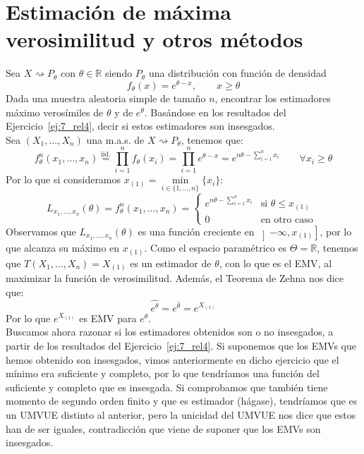\newpage
\section{Estimación de máxima verosimilitud y otros métodos}
\begin{ejercicio}
    Sea $X\rightsquigarrow P_\theta$ con $\theta\in \mathbb{R}$ siendo $P_\theta$ una distribución con función de densidad
    \begin{equation*}
        f_\theta(x) = e^{\theta-x}, \qquad x\geq \theta
    \end{equation*}
    Dada una muestra aleatoria simple de tamaño $n$, encontrar los estimadores máximo verosímiles de $\theta$ y de $e^\theta$. Basándose en los resultados del Ejercicio~\ref{ej:7_rel4}, decir si estos estimadores son insesgados.\\

    \noindent
    Sea $(X_1, \ldots, X_n)$ una m.a.s. de $X\rightsquigarrow  P_\theta$, tenemos que:
    \begin{equation*}
        f^n_\theta(x_1, \ldots, x_n) \stackrel{\text{iid.}}{=} \prod_{i=1}^{n}f_\theta(x_i) = \prod_{i=1}^{n} e^{\theta-x} = e^{n\theta - \sum\limits_{i=1}^n x_i} \qquad \forall x_i \geq \theta
    \end{equation*}
    Por lo que si consideramos $x_{(1)} = \min\limits_{i \in \{1,\ldots,n\}}\{x_i\}$:
    \begin{equation*}
        L_{x_1,\ldots, x_n}(\theta) = f^n_\theta(x_1,\ldots,x_n) = \left\{\begin{array}{ll}
                e^{n\theta - \sum\limits_{i=1}^n x_i}  & \text{si\ } \theta \leq x_{(1)}  \\
             0 & \text{en otro caso\ } 
        \end{array}\right. 
    \end{equation*}
    Observamos que $L_{x_1,\ldots,x_n}(\theta)$ es una función creciente en $\left]-\infty,x_{(1)}\right]$, por lo que alcanza su máximo en $x_{(1)}$. Como el espacio paramétrico es $\Theta = \mathbb{R}$, tenemos que $T(X_1, \ldots, X_n) = X_{(1)}$ es un estimador de $\theta$, con lo que es el EMV, al maximizar la función de verosimilitud. Además, el Teorema de Zehna nos dice que:
    \begin{equation*}
        \widehat{e^\theta} = e^{\hat{\theta}} = e^{X_{(1)}}
    \end{equation*}
    Por lo que $e^{X_{(1)}}$ es EMV para $e^{\theta}$.\\ 

    \noindent
    Buscamos ahora razonar si los estimadores obtenidos son o no insesgados, a partir de los resultados del Ejercicio~\ref{ej:7_rel4}. Si suponemos que los EMVs que hemos obtenido son insesgados, vimos anteriormente en dicho ejercicio que el mínimo era suficiente y completo, por lo que tendríamos una función del suficiente y completo que es insesgada. Si comprobamos que también tiene momento de segundo orden finito y que es estimador (hágase), tendríamos que es un UMVUE distinto al anterior, pero la unicidad del UMVUE nos dice que estos han de ser iguales, contradicción que viene de suponer que los EMVs son insesgados.
\end{ejercicio}

